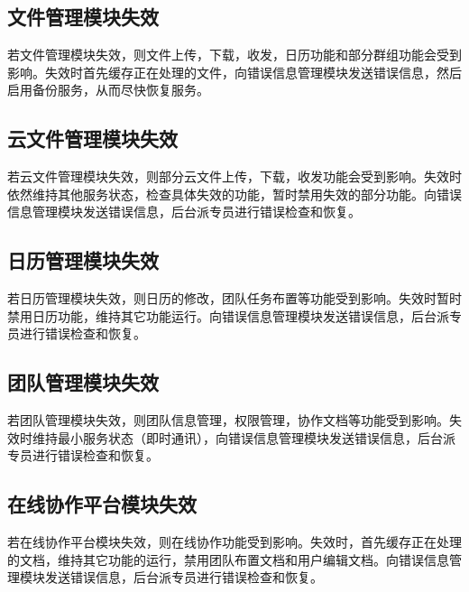 \subsection{文件管理模块失效}
若文件管理模块失效，则文件上传，下载，收发，日历功能和部分群组功能会受到影响。失效时首先缓存正在处理的文件，向错误信息管理模块发送错误信息，然后启用备份服务，从而尽快恢复服务。
\subsection{云文件管理模块失效}
若云文件管理模块失效，则部分云文件上传，下载，收发功能会受到影响。失效时依然维持其他服务状态，检查具体失效的功能，暂时禁用失效的部分功能。向错误信息管理模块发送错误信息，后台派专员进行错误检查和恢复。
\subsection{日历管理模块失效}
若日历管理模块失效，则日历的修改，团队任务布置等功能受到影响。失效时暂时禁用日历功能，维持其它功能运行。向错误信息管理模块发送错误信息，后台派专员进行错误检查和恢复。
\subsection{团队管理模块失效}
若团队管理模块失效，则团队信息管理，权限管理，协作文档等功能受到影响。失效时维持最小服务状态（即时通讯），向错误信息管理模块发送错误信息，后台派专员进行错误检查和恢复。
\subsection{在线协作平台模块失效}
若在线协作平台模块失效，则在线协作功能受到影响。失效时，首先缓存正在处理的文档，维持其它功能的运行，禁用团队布置文档和用户编辑文档。向错误信息管理模块发送错误信息，后台派专员进行错误检查和恢复。
